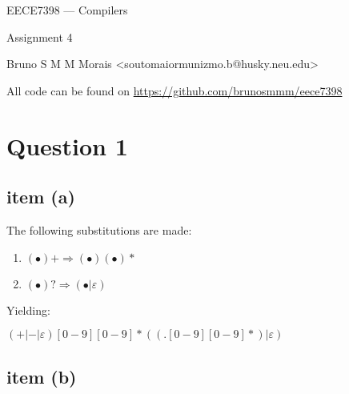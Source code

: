 \documentclass[10pt]{article}
\begin{document}
\begin{center}
\huge EECE7398 --- Compilers

Assignment 4

\vskip1cm

\normalsize\ttfamily Bruno S M M Morais <soutomaiormunizmo.b@husky.neu.edu>

All code can be found on \url{https://github.com/brunosmmm/eece7398}

\end{center}

\vskip1cm

\section*{Question 1}
\subsection*{item (a)}

\large

The following substitutions are made:

\begin{enumerate}
\item $(\bullet)+ \Rightarrow (\bullet)(\bullet)*$
\item $(\bullet)? \Rightarrow (\bullet | \varepsilon)$
\end{enumerate}

Yielding:

$\left( +|-| \varepsilon \right) [0-9][0-9]* ((.[0-9][0-9]*)|\varepsilon)$

\subsection*{item (b)}
\end{document}
